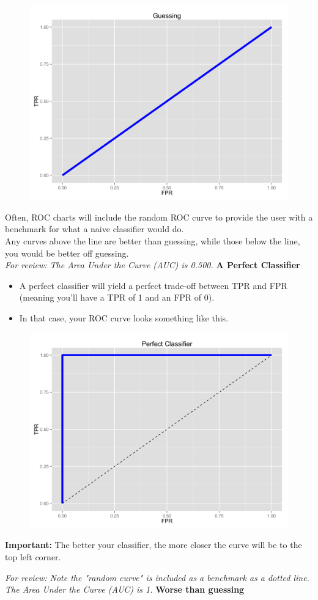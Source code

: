 \documentclass[SKL-MASTER.tex]{subfiles}
\begin{document}
\begin{figure}[h!]
\centering
\includegraphics[width=0.7\linewidth]{images/roc-guessing}
\end{figure}
\noindent Often, ROC charts will include the random ROC curve to provide the user with a benchmark for what a naive classifier would do.\\  Any curves above the line are better than guessing, while those below the line, you would be better off guessing.
\\
\noindent \textit{For review: The Area Under the Curve (AUC)  is 0.500.} 
\newpage
\noindent \textbf{A Perfect Classifier}
\begin{itemize}
\item 
A perfect classifier will yield a perfect trade-off between TPR and FPR (meaning you'll have a TPR of 1 and an FPR of 0).
\item In that case, your ROC curve looks something like this.
\end{itemize}

\begin{figure}[h!]
\centering
\includegraphics[width=0.7\linewidth]{images/roc-perfect}
\end{figure}
\begin{framed}
\noindent \textbf{Important:} The better your classifier, the more closer the curve will be to the top left corner.
\end{framed}
\noindent \textit{For review: Note the "random curve" is included as a benchmark as a dotted line.\\ 
The Area Under the Curve (AUC) is 1.}
\newpage
\noindent \textbf{Worse than guessing}\\
\end{document}
